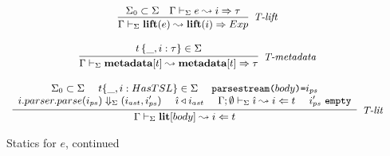 \begin{figure}
\centering
\[
\footnotesize
\begin{array}{c}
\infer[\textit{T-lift}]
        {\Gamma \vdash_\Sigma \keyw{lift}(e) \leadsto \keyw{lift}(i) \Rightarrow Exp}
	{\Sigma_0 \subset \Sigma & \Gamma \vdash_\Sigma e \leadsto i \Rightarrow \tau } \\[3ex]

\infer[\textit{T-metadata}]
        {\Gamma \vdash_\Sigma \keyw{metadata}[t]  \leadsto \keyw{metadata}[t]  \Rightarrow \tau}
	{t\,\{\_, i:\tau\} \in \Sigma} \\[3ex]

\infer[\textit{T-lit}]
	  {\Gamma \vdash_\Sigma \keyw{lit}[body] \leadsto i \Leftarrow t}
	  {\begin{array}{c}
	   \Sigma_0 \subset \Sigma ~~~~
	   t \{\_, i : HasTSL\} \in \Sigma ~~~~
	   \texttt{parsestream(}body\texttt{)=}i_{ps} \\
	   i.parser.parse(i_{ps}) \Downarrow_\Sigma (i_{ast}, i'_{ps})~~~~
	   \hat{\imath} \triangleleft i_{ast}~~~~
	   \Gamma; \emptyset \vdash_\Sigma \hat{\imath} \leadsto i \Leftarrow t~~~~
	   i'_{ps}~\texttt{empty}
	   \end{array}}
\end{array}
\]
\vspace{-10px}
\label{fig:statics2}
\caption{Statics for $e$, continued}
\end{figure}
\newcommand{\Gout}{\Gamma_{\text{out}}}
